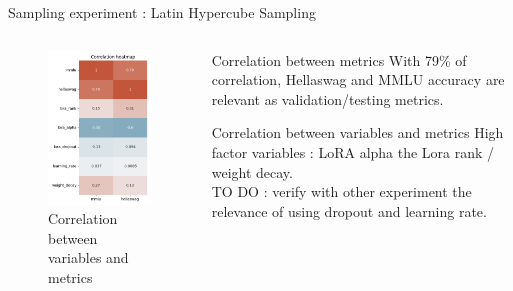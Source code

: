 \begin{frame}[allowframebreaks]{Sampling experiment : Latin Hypercube Sampling}
    \begin{columns}
        \begin{column}{0.3\textwidth}
        \begin{figure}
            \centering
            \includegraphics[width = \textwidth]{imgs/experiments/lhs_correlation.png}     
            \caption{Correlation between variables and metrics}         
        \end{figure}
         
        \end{column}
        \begin{column}{0.6\textwidth}
            \begin{block}{Correlation between metrics}
                With 79\% of correlation, Hellaswag and MMLU accuracy are relevant as validation/testing metrics.
            \end{block}
            \begin{block}{Correlation between variables and metrics}
                High factor variables : LoRA alpha the Lora rank / weight decay.\\
                TO DO : verify with other experiment the relevance of using dropout and learning rate.
            \end{block}
        \end{column}
    \end{columns}


\end{frame}
